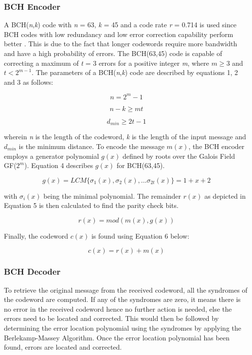 \documentclass[pdftex,11pt,a4paper]{article}
\begin{document}
\subsubsection{BCH Encoder}
A BCH(\textit{n},\textit{k}) code with \textit{n} = 63, \textit{k} = 45 and a code rate \textit{r} = 0.714 is used since BCH codes with low redundancy and low error correction capability perform better \cite{14_7}. This is due to the fact that longer codewords require more bandwidth and have a high probability of errors. The BCH(63,45) code is capable of correcting a maximum of \textit{t} = 3 errors for a positive integer \textit{m}, where \(m\geq3\) and \(t<2^{m-1}\). The parameters of a BCH(\textit{n},\textit{k}) code are described by equations 1, 2 and 3 as follows:

\begin{equation}
	n = 2^{m}-1
\end{equation}

\begin{equation}
	n-k\geq mt
\end{equation}

\begin{equation}
	d_{min} \geq 2t -1
\end{equation}

wherein \textit{n} is the length of the codeword, \textit{k} is the length of the input message and \(d_{min}\) is the minimum distance. To encode the message \(m(x)\), the BCH encoder employs a generator polynomial \(g(x)\) defined by roots over the Galois Field GF($2^{m}$). Equation 4 describes \(g(x)\) for BCH(63,45).

\begin{equation} 
	g(x)= LCM\{\sigma_{1}(x),\sigma_{2}(x),... \sigma_{2t}(x)\} = 1 +x+2
\end{equation}

with \(\sigma_{i}(x)\) being the minimal polynomial. The remainder \(r(x)\) as depicted in Equation 5 is then calculated to find the parity check bits.

\begin{equation}
	r(x) = mod(m(x), g(x)) 
\end{equation}

Finally, the codeword \(c(x)\) is found using Equation 6 below:

\begin{equation}
	c(x) = r(x) + m(x)
\end{equation}

\subsubsection{BCH Decoder}
To retrieve the original message from the received codeword, all the syndromes of the codeword are computed. If any of the syndromes are zero, it means there is no error in the received codeword hence no further action is needed, else the errors need to be located and corrected. This would then be followed by determining the error location polynomial using the syndromes by applying the Berlekamp-Massey Algorithm. Once the error location polynomial has been found, errors are located and corrected.
\end{document}
